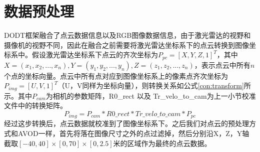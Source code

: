 


\section{数据预处理}
\label{preprocessing}
DODT框架融合了点云数据信息以及RGB图像数据信息，由于激光雷达的视野和摄像机的视野不同，因此在融合之前需要将激光雷达坐标系下的点云转换到图像坐标系中。假设激光雷达坐标系下点云的齐次坐标为$P_{pc}=[X,Y,Z,1]^T$，其中$X=(x_1,x_2,...,x_n),Y=(y_1,y_2,...,y_n),Z=(z_1,z_2,...,z_n)$，表示点云中所有$n$个点的坐标向量。点云中所有点对应到图像坐标系上的像素点齐次坐标为$P_{img} = [U,V,1]^T$（U，V同样为坐标向量），则转换关系如公式\ref{con:transform}所示。其中$P_{cam}$为相机的参数矩阵，R0\_rect 以及 Tr\_velo\_to\_cam为上一小节校准文件中的转换矩阵。
\begin{equation}
P_{img} = P_{cam} * R0\_rect * Tr\_velo\_to\_cam * P_{pc}
\label{con:transform}
\end{equation}
经过这步转换后，点云数据就校准到了图像坐标系下。之后我们对点云的预处理方式和AVOD\cite{ku2018joint}一样，首先将落在图像尺寸之外的点过滤掉，然后分别沿X，Z，Y轴截取$[-40,40] \times [0,70] \times [0,2.5]$米的区域作为最终的点云数据。

